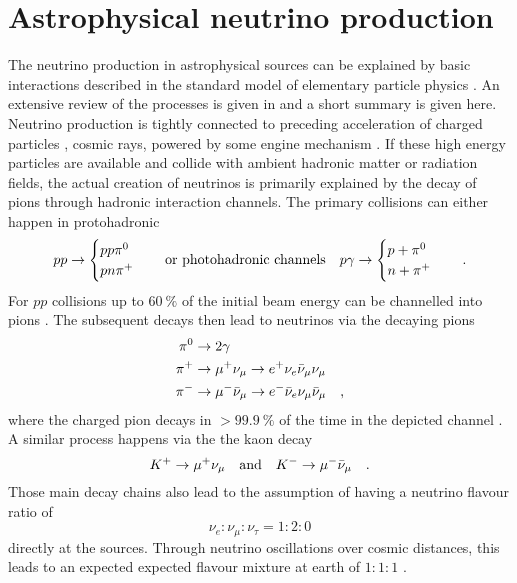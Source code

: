 \section{Astrophysical neutrino production}
  \label{chp:astro_nu_production}
The neutrino production in astrophysical sources can be explained by basic interactions described in the standard model of elementary particle physics \cite{Patrignani:2016xqp,Herrero:1998eq}.
An extensive review of the processes is given in \cite{Gaisser:1990vg,Gaisser:2016uoy,Grupen:2005rx} and a short summary is given here.
Neutrino production is tightly connected to preceding acceleration  of charged particles \cite{FermiShockAcc}, cosmic rays, powered by some engine mechanism \cite{NetzerAGNReview,Beckmann:2013wte,Urry:1995mg}.
If these high energy particles are available and collide with ambient hadronic matter or radiation fields, the actual creation of neutrinos is primarily explained by the decay of pions through hadronic interaction channels.
The primary collisions can either happen in protohadronic
\begin{equation}
  p p \rightarrow
    \begin{cases}
      p p \pi^0 \\
      p n \pi^+
    \end{cases}
    \quad\text{or photohadronic channels}\quad
  p \gamma \rightarrow
    \begin{cases}
      p + \pi^0 \\
      n + \pi^+
    \end{cases}
  \quad\text{.}
\end{equation}
For $pp$ collisions up to $\SI{60}{\percent}$ of the initial beam energy can be channelled into pions \cite{Frichter:1997wh}.
The subsequent decays then lead to neutrinos via the decaying pions
\begin{align}
  \pi^0 &\rightarrow 2\gamma \\
  \pi^+ &\rightarrow \mu^+ \nu_\mu
         \rightarrow e^+ \nu_e \bar{\nu}_\mu \nu_\mu \\
  \pi^- &\rightarrow \mu^- \bar{\nu}_\mu
         \rightarrow e^- \bar{\nu}_e \nu_\mu \bar{\nu}_\mu
  \quad\text{,}
\end{align}
where the charged pion decays in $>\SI{99,9}{\percent}$ of the time in the depicted channel \cite{Patrignani:2016xqp}.
A similar process happens via the the kaon decay \cite{GAISSER2012801}
\begin{equation}
  K^+ \rightarrow \mu^+ \nu_\mu
  \quad\text{and}\quad
  K^- \rightarrow \mu^- \bar{\nu}_\mu
  \quad\text{.}
\end{equation}
Those main decay chains also lead to the assumption of having a neutrino flavour ratio of
\begin{equation}
  \nu_e : \nu_\mu : \nu_\tau = 1 : 2 : 0
\end{equation}
directly at the sources.
Through neutrino oscillations over cosmic distances, this leads to an expected expected flavour mixture at earth of $1:1:1$ \cite{Athar:2005wg,Athar:2000yw}.

